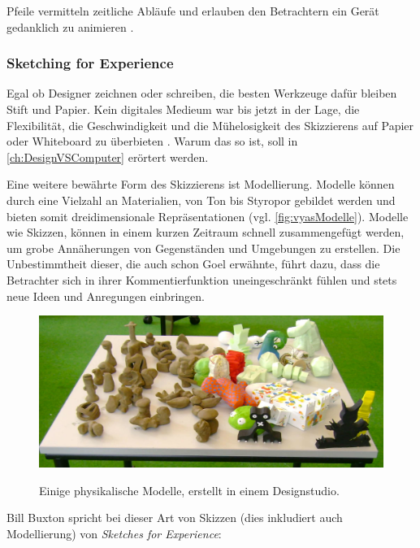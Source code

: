 Pfeile vermitteln zeitliche Abläufe und erlauben den Betrachtern ein Gerät gedanklich zu animieren \citep{Hegarty:1992}.

\subsubsection{Sketching for Experience}

Egal ob Designer zeichnen oder schreiben, die besten Werkzeuge dafür bleiben Stift und Papier. Kein digitales Medieum war bis jetzt in der Lage, die Flexibilität, die Geschwindigkeit und die Mühelosigkeit des Skizzierens auf Papier oder Whiteboard zu überbieten \citep{Sagmeister:2008}. Warum das so ist, soll in \autoref{ch:DesignVSComputer} erörtert werden.

\medskip Eine weitere bewährte Form des Skizzierens ist Modellierung. Modelle können durch eine Vielzahl an Materialien, von Ton bis Styropor gebildet werden und bieten somit dreidimensionale Repräsentationen (vgl. \autoref{fig:vyasModelle}). Modelle wie Skizzen, können in einem kurzen Zeitraum schnell zusammengefügt werden, um grobe Annäherungen von Gegenständen und Umgebungen zu erstellen. Die Unbestimmtheit dieser, die auch schon Goel erwähnte, führt dazu, dass die Betrachter sich in ihrer Kommentierfunktion uneingeschränkt fühlen und stets neue Ideen und Anregungen einbringen.

\begin{figure}
	\begin{center}
        {\includegraphics[width=\linewidth]{gfx/vyasModelle}}
	\end{center}
		\caption[Physikalische Modelle. \newline \citep{Vyas:2008}]{Einige physikalische Modelle, erstellt in einem Designstudio.}\label{fig:vyasModelle}
\end{figure}

\medskip Bill Buxton spricht bei dieser Art von Skizzen (dies inkludiert auch Modellierung) von \emph{Sketches for Experience}: 

